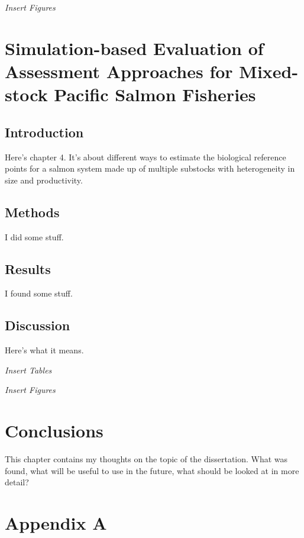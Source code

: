 \documentclass[12pt,]{book}
\theoremstyle{definition}
\theoremstyle{definition}
\theoremstyle{definition}
\theoremstyle{remark}
\begin{document}
\emph{Insert Figures}

\chapter{Simulation-based Evaluation of Assessment Approaches for
Mixed-stock Pacific Salmon Fisheries}\label{ch4}

\section{Introduction}\label{introduction-2}

Here's chapter 4. It's about different ways to estimate the biological
reference points for a salmon system made up of multiple substocks with
heterogeneity in size and productivity.

\section{Methods}\label{methods-2}

I did some stuff.

\section{Results}\label{results-2}

I found some stuff.

\section{Discussion}\label{discussion-2}

Here's what it means.

\emph{Insert Tables}

\emph{Insert Figures}

\chapter{Conclusions}\label{ch5}

This chapter contains my thoughts on the topic of the dissertation. What
was found, what will be useful to use in the future, what should be
looked at in more detail?

\hypertarget{appendix-a}{\chapter*{Appendix A}\label{appendix-a}}
\end{document}
